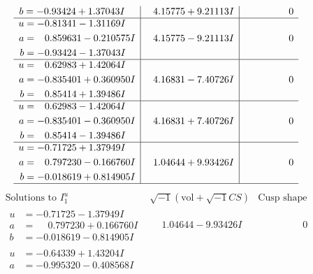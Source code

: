 \documentclass[1p]{elsarticle_modified}
\theoremstyle{definition}
\newcommand{\I}{\sqrt{-1}}
\begin{document}
$$\begin{array}{c|c|c}
\begin{aligned}
b &= -0.93424 + 1.37043 I\end{aligned}
 & \phantom{-}4.15775 + 9.21113 I & \phantom{-0.000000 } 0 \\ \hline\begin{aligned}
u &= -0.81341 - 1.31169 I \\
a &= \phantom{-}0.859631 - 0.210575 I \\
b &= -0.93424 - 1.37043 I\end{aligned}
 & \phantom{-}4.15775 - 9.21113 I & \phantom{-0.000000 } 0 \\ \hline\begin{aligned}
u &= \phantom{-}0.62983 + 1.42064 I \\
a &= -0.835401 + 0.360950 I \\
b &= \phantom{-}0.85414 + 1.39486 I\end{aligned}
 & \phantom{-}4.16831 - 7.40726 I & \phantom{-0.000000 } 0 \\ \hline\begin{aligned}
u &= \phantom{-}0.62983 - 1.42064 I \\
a &= -0.835401 - 0.360950 I \\
b &= \phantom{-}0.85414 - 1.39486 I\end{aligned}
 & \phantom{-}4.16831 + 7.40726 I & \phantom{-0.000000 } 0 \\ \hline\begin{aligned}
u &= -0.71725 + 1.37949 I \\
a &= \phantom{-}0.797230 - 0.166760 I \\
b &= -0.018619 + 0.814905 I\end{aligned}
 & \phantom{-}1.04644 + 9.93426 I & \phantom{-0.000000 } 0\\
 \hline 
 \end{array}$$\newpage$$\begin{array}{c|c|c}  
\text{Solutions to }I^u_{1}& \I (\text{vol} + \sqrt{-1}CS) & \text{Cusp shape}\\
 \hline 
\begin{aligned}
u &= -0.71725 - 1.37949 I \\
a &= \phantom{-}0.797230 + 0.166760 I \\
b &= -0.018619 - 0.814905 I\end{aligned}
 & \phantom{-}1.04644 - 9.93426 I & \phantom{-0.000000 } 0 \\ \hline\begin{aligned}
u &= -0.64339 + 1.43204 I \\
a &= -0.995320 - 0.408568 I \\

\end{aligned}
\end{array}$$
\end{document}
